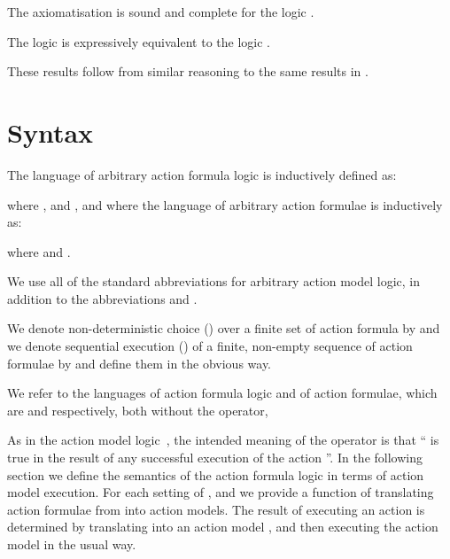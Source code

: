 \documentclass[twoside]{aiml14}
\begin{document}
  \begin{proposition}
      The axiomatisation \axiomAamlS{} is sound and complete for the logic \logicAamlS{}.
  \end{proposition}

  \begin{proposition}
      The logic \logicAamlS{} is expressively equivalent to the logic \logicS{}.
  \end{proposition}

  These results follow from similar reasoning to the same results in \logicAamlK{}.

  \section{Syntax}\label{syntax}

  \begin{definition}
      The language \langAafl{} of arbitrary action formula logic is inductively defined as:
      
      where ,  and 
      , and where the language \langAaflAct{} of 
      arbitrary action formulae is inductively as:
      
      where  and .
  \end{definition}

  We use all of the standard abbreviations for arbitrary action model logic, in
  addition to the abbreviations
   and 
  .

  We denote non-deterministic choice () over a finite set of action
  formula  by  
  and we denote sequential execution () of a finite, non-empty
  sequence of action formulae  
  by  and define them in the obvious way.

  We refer to the languages \langAfl{} of action formula logic and \langAflAct{} of action formulae, which are \langAafl{} and \langAaflAct{} respectively, both without the  operator, 

  As in the action model logic~\cite{baltag2005}, the intended meaning of the
  operator  is that `` is true in the result of
  any successful execution of the action ''. In the following section
  we define the semantics of the action formula logic in terms of action model
  execution. For each setting of \classK{}, \classKFF{} and \classS{} we
  provide a function  of translating
  action formulae from \langAflAct{} into action models. The result of
  executing an action  is determined by translating
   into an action model , and then executing
  the action model in the usual way.
\end{document}
